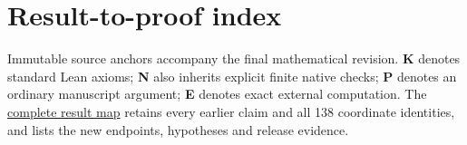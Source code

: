 \section*{Result-to-proof index}\label{j:proof-index}

Immutable source anchors accompany the final mathematical revision.
\textbf{K} denotes standard Lean axioms; \textbf{N} also inherits explicit finite native checks; \textbf{P} denotes an ordinary manuscript argument; \textbf{E} denotes exact external computation. The
\href{https://github.com/alejandrozu/kobon-proof/blob/manuscripts-2026-10-07/manuscripts/2026-10-07/shared/proof_map.md}{complete result map}
retains every earlier claim and all 138 coordinate identities, and lists the new endpoints, hypotheses and release evidence.

\begingroup\small\renewcommand{\arraystretch}{0.96}
\setlength{\LTleft}{0pt}\setlength{\LTright}{0pt}

